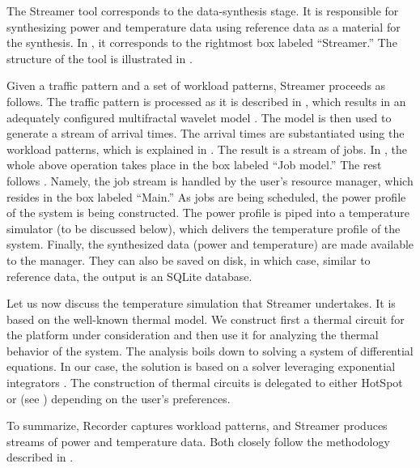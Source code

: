 
The Streamer tool corresponds to the data-synthesis stage. It is responsible for
synthesizing power and temperature data using reference data as a material for
the synthesis. In , it corresponds to the rightmost box
labeled ``Streamer.'' The structure of the tool is illustrated in
.

Given a traffic pattern and a set of workload patterns, Streamer proceeds as
follows. The traffic pattern is processed as it is described in ,
which results in an adequately configured multifractal wavelet model
\cite{riedi1999}. The model is then used to generate a stream of arrival times.
The arrival times are substantiated using the workload patterns, which is
explained in . The result is a stream of jobs. In
, the whole above operation takes place in the box labeled ``Job
model.'' The rest follows . Namely, the job stream is handled
by the user's resource manager, which resides in the box labeled ``Main.'' As
jobs are being scheduled, the power profile of the system is being constructed.
The power profile is piped into a temperature simulator (to be discussed below),
which delivers the temperature profile of the system. Finally, the synthesized
data (power and temperature) are made available to the manager. They can also be
saved on disk, in which case, similar to reference data, the output is an SQLite
database.

Let us now discuss the temperature simulation that Streamer undertakes. It is
based on the well-known thermal  model. We construct first a thermal
 circuit for the platform under consideration and then use it for
analyzing the thermal behavior of the system. The analysis boils down to solving
a system of differential equations. In our case, the solution is based on a
solver leveraging exponential integrators \cite{ukhov2014}. The construction of
thermal circuits is delegated to either HotSpot \cite{skadron2004} or
 \cite{sridhar2010} (see ) depending on the user's
preferences.

To summarize, Recorder captures workload patterns, and Streamer produces streams
of power and temperature data. Both closely follow the methodology described in
.
